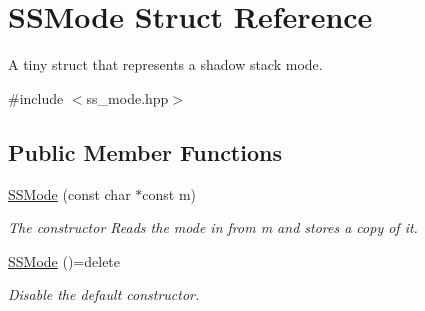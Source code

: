 \hypertarget{struct_s_s_mode}{}\section{S\+S\+Mode Struct Reference}
\label{struct_s_s_mode}


A tiny struct that represents a shadow stack mode.  




{\ttfamily \#include $<$ss\+\_\+mode.\+hpp$>$}

\subsection*{Public Member Functions}
\begin{DoxyCompactItemize}
\item 
\hyperlink{struct_s_s_mode_acf06136523caccfa31298e20db0980ce}{S\+S\+Mode} (const char $\ast$const m)
\begin{DoxyCompactList}\small\item\em The constructor Reads the mode in from m and stores a copy of it. \end{DoxyCompactList}\item 
\hyperlink{struct_s_s_mode_ab0b59c6a937b185e602dc4b252c0f036}{S\+S\+Mode} ()=delete
\begin{DoxyCompactList}\small\item\em Disable the default constructor. \end{DoxyCompactList}\end{DoxyCompactItemize}
